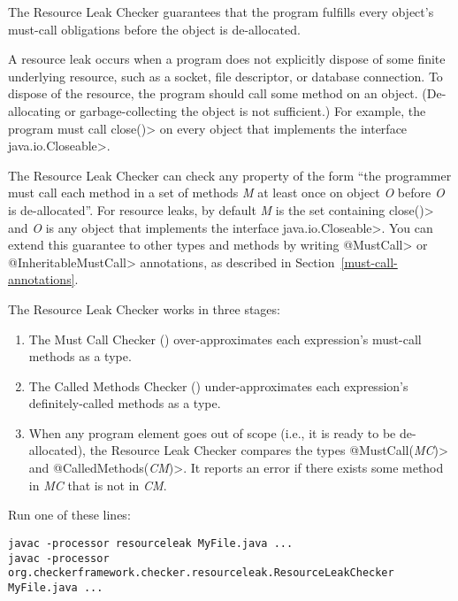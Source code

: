 \htmlhr
{}

The Resource Leak Checker guarantees that the program fulfills every object's
must-call obligations before the object is de-allocated.

A resource leak occurs when a program does not explicitly dispose of some finite
underlying resource, such as a socket, file descriptor, or database connection.  To dispose
of the resource, the program should call some method on an object.
(De-allocating or garbage-collecting the object is not sufficient.)  For
example, the program must call \<close()> on every object that implements the
interface \<java.io.Closeable>.

The Resource Leak Checker can check any property of the form ``the programmer
must call each method in a set of methods \emph{M} at least once
on object \emph{O} before \emph{O} is de-allocated''.  For resource leaks,
by default \emph{M} is the set containing
\<close()> and \emph{O} is any object that implements the interface
\<java.io.Closeable>.  You can extend this guarantee to other types and methods
by writing \<@MustCall> or \<@InheritableMustCall> annotations, as described in
Section~\ref{must-call-annotations}.

The Resource Leak Checker works in three stages:
\begin{enumerate}
\item The Must Call Checker ()
  over-approximates each expression's must-call methods as a
   type.
\item The Called Methods Checker ()
  under-approximates each expression's definitely-called methods as a
   type.
\item When any program element goes out of scope (i.e., it is ready to be
  de-allocated), the Resource Leak Checker compares the types
  \<@MustCall(\emph{MC})> and \<@CalledMethods(\emph{CM})>.  It reports an error
  if there exists some method in \emph{MC} that is not in \emph{CM}.
\end{enumerate}



Run one of these lines:

\begin{Verbatim}
javac -processor resourceleak MyFile.java ...
javac -processor org.checkerframework.checker.resourceleak.ResourceLeakChecker MyFile.java ...
\end{Verbatim}

